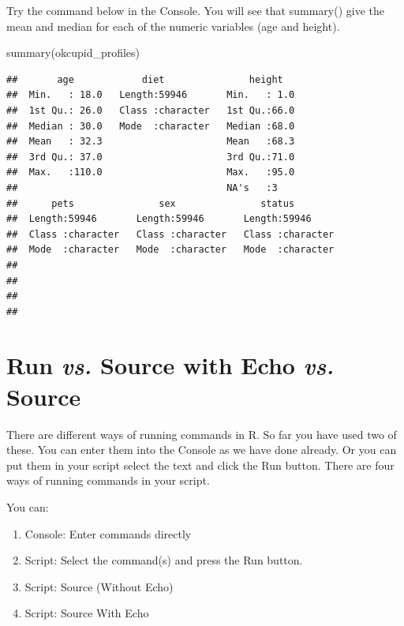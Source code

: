 \documentclass[
]{krantz}
\makeatletter
\newenvironment{Shaded}{\begin{snugshade}}{\end{snugshade}}
\newcommand{\FunctionTok}[1]{\textcolor[rgb]{0,0,0}{#1}}
\newcommand{\NormalTok}[1]{#1}
\providecommand{\tightlist}{%
  \setlength{\itemsep}{0pt}\setlength{\parskip}{0pt}}
\newenvironment{kframe}{%
\medskip{}
\setlength{\fboxsep}{.8em}
 \def\at@end@of@kframe{}%
 \ifinner\ifhmode%
  \def\at@end@of@kframe{\end{minipage}}%
  \begin{minipage}{\columnwidth}%
 \fi\fi%
 \def\FrameCommand##1{\hskip\@totalleftmargin \hskip-\fboxsep
 \colorbox{shadecolor}{##1}\hskip-\fboxsep
     \hskip-\linewidth \hskip-\@totalleftmargin \hskip\columnwidth}%
 \MakeFramed {\advance\hsize-\width
   \@totalleftmargin\z@ \linewidth\hsize
   \@setminipage}}%
 {\par\unskip\endMakeFramed%
 \at@end@of@kframe}
\renewenvironment{Shaded}{\begin{kframe}}{\end{kframe}}
\makeatother
\begin{document}
Try the command below in the Console. You will see that summary() give the mean and median for each of the numeric variables (age and height).

\begin{Shaded}
\begin{Highlighting}[]
\FunctionTok{summary}\NormalTok{(okcupid\_profiles)}
\end{Highlighting}
\end{Shaded}

\begin{verbatim}
##       age            diet               height    
##  Min.   : 18.0   Length:59946       Min.   : 1.0  
##  1st Qu.: 26.0   Class :character   1st Qu.:66.0  
##  Median : 30.0   Mode  :character   Median :68.0  
##  Mean   : 32.3                      Mean   :68.3  
##  3rd Qu.: 37.0                      3rd Qu.:71.0  
##  Max.   :110.0                      Max.   :95.0  
##                                     NA's   :3     
##      pets               sex               status         
##  Length:59946       Length:59946       Length:59946      
##  Class :character   Class :character   Class :character  
##  Mode  :character   Mode  :character   Mode  :character  
##                                                          
##                                                          
##                                                          
## 
\end{verbatim}

\hypertarget{run-vs.-source-with-echo-vs.-source}{%
\section{\texorpdfstring{Run \emph{vs.} Source with Echo \emph{vs.} Source}{Run vs. Source with Echo vs. Source}}\label{run-vs.-source-with-echo-vs.-source}}

There are different ways of running commands in R. So far you have used two of these. You can enter them into the Console as we have done already. Or you can put them in your script select the text and click the Run button. There are four ways of running commands in your script.

You can:

\begin{enumerate}
\def\labelenumi{\arabic{enumi}.}
\tightlist
\item
  Console: Enter commands directly
\item
  Script: Select the command(s) and press the Run button.
\item
  Script: Source (Without Echo)
\item
  Script: Source With Echo
\end{enumerate}
\end{document}
